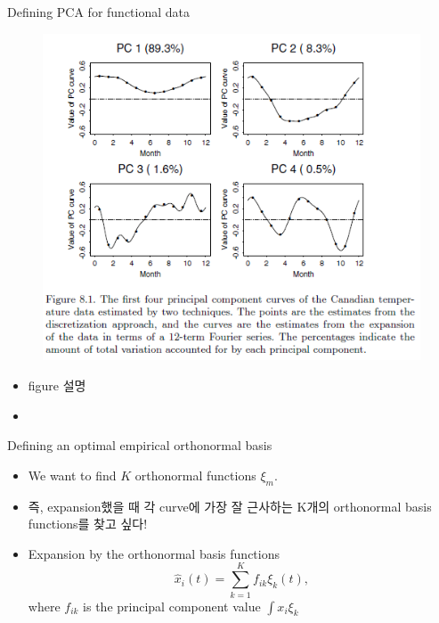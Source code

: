 \documentclass{beamer}
\begin{document}
\begin{frame}{Defining PCA for functional data}
	\begin{figure}[h] %
		\begin{center}
			\includegraphics[width=0.7\linewidth]{img/5.png}
		\end{center}
		\label{fig:long}
		\label{fig:onecol}
	\end{figure}	
\begin{itemize}
	\item {
		figure 설명
	}
	\item {
		
	}
\end{itemize}
\end{frame}

\begin{frame}{Defining an optimal empirical orthonormal basis}
\begin{itemize}
	\item {
		We want to find $K$ orthonormal functions $\xi_m$. \\
	}
	\item {
		즉, expansion했을 때 각 curve에 가장 잘 근사하는 K개의 orthonormal basis functions를 찾고 싶다!
	}
	\item {
		Expansion by the orthonormal basis functions
		$$ \hat{x}_i(t) = \sum_{k=1}^K f_{ik}\xi_{k}(t), $$
		where $ f_{ik} $ is the principal component value $\int x_i\xi_k$
	}
\end{itemize}
\end{frame}
\end{document}
